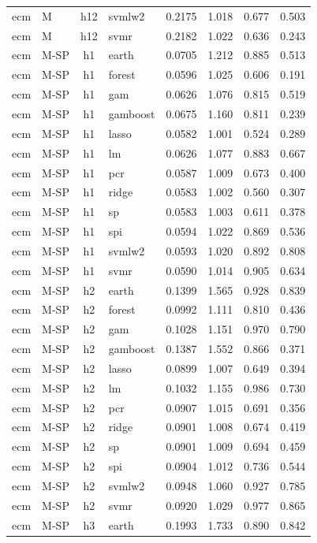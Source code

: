 \begin{ThreePartTable}
\begin{longtable}[t]{llclcccc}
ecm & M & h12 & svmlw2 & 0.2175 & 1.018 & 0.677 & 0.503\\
ecm & M & h12 & svmr & 0.2182 & 1.022 & 0.636 & 0.243\\
\addlinespace
ecm & M-SP & h1 & earth & 0.0705 & 1.212 & 0.885 & 0.513\\
ecm & M-SP & h1 & forest & 0.0596 & 1.025 & 0.606 & 0.191\\
ecm & M-SP & h1 & gam & 0.0626 & 1.076 & 0.815 & 0.519\\
ecm & M-SP & h1 & gamboost & 0.0675 & 1.160 & 0.811 & 0.239\\
ecm & M-SP & h1 & lasso & 0.0582 & 1.001 & 0.524 & 0.289\\
ecm & M-SP & h1 & lm & 0.0626 & 1.077 & 0.883 & 0.667\\
ecm & M-SP & h1 & pcr & 0.0587 & 1.009 & 0.673 & 0.400\\
ecm & M-SP & h1 & ridge & 0.0583 & 1.002 & 0.560 & 0.307\\
ecm & M-SP & h1 & sp & 0.0583 & 1.003 & 0.611 & 0.378\\
ecm & M-SP & h1 & spi & 0.0594 & 1.022 & 0.869 & 0.536\\
ecm & M-SP & h1 & svmlw2 & 0.0593 & 1.020 & 0.892 & 0.808\\
ecm & M-SP & h1 & svmr & 0.0590 & 1.014 & 0.905 & 0.634\\
\addlinespace
ecm & M-SP & h2 & earth & 0.1399 & 1.565 & 0.928 & 0.839\\
ecm & M-SP & h2 & forest & 0.0992 & 1.111 & 0.810 & 0.436\\
ecm & M-SP & h2 & gam & 0.1028 & 1.151 & 0.970 & 0.790\\
ecm & M-SP & h2 & gamboost & 0.1387 & 1.552 & 0.866 & 0.371\\
ecm & M-SP & h2 & lasso & 0.0899 & 1.007 & 0.649 & 0.394\\
ecm & M-SP & h2 & lm & 0.1032 & 1.155 & 0.986 & 0.730\\
ecm & M-SP & h2 & pcr & 0.0907 & 1.015 & 0.691 & 0.356\\
ecm & M-SP & h2 & ridge & 0.0901 & 1.008 & 0.674 & 0.419\\
ecm & M-SP & h2 & sp & 0.0901 & 1.009 & 0.694 & 0.459\\
ecm & M-SP & h2 & spi & 0.0904 & 1.012 & 0.736 & 0.544\\
ecm & M-SP & h2 & svmlw2 & 0.0948 & 1.060 & 0.927 & 0.785\\
ecm & M-SP & h2 & svmr & 0.0920 & 1.029 & 0.977 & 0.865\\
\addlinespace
ecm & M-SP & h3 & earth & 0.1993 & 1.733 & 0.890 & 0.842\\

\end{longtable}
\end{ThreePartTable}
